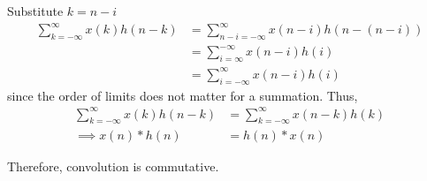 \documentclass[journal,12pt,twocolumn]{IEEEtran}
\renewcommand\thesection{\arabic{section}}
\begin{document}
\begin{enumerate}[label=\thesection.\arabic*]
Substitute $k = n - i$
\begin{align}
      \sum_{k=-\infty}^{\infty}x(k)h(n-k) &=  \sum_{n - i =-\infty}^{\infty}x(n-i)h(n-(n-i)) \\
      &= \sum_{i = \infty}^{-\infty} x(n - i) h(i) \\
      &= \sum_{i = -\infty}^{\infty} x(n - i) h(i)
\end{align}
since the order of limits does not matter for a summation.
Thus,
\begin{align}
     \sum_{k=-\infty}^{\infty}x(k)h(n-k) &= \sum_{k=-\infty}^{\infty}x(n-k)h(k) \\
     \implies x(n) * h(n) &= h(n) * x(n)
\end{align}

Therefore, convolution is commutative.
\end{enumerate}
%
\end{document}
